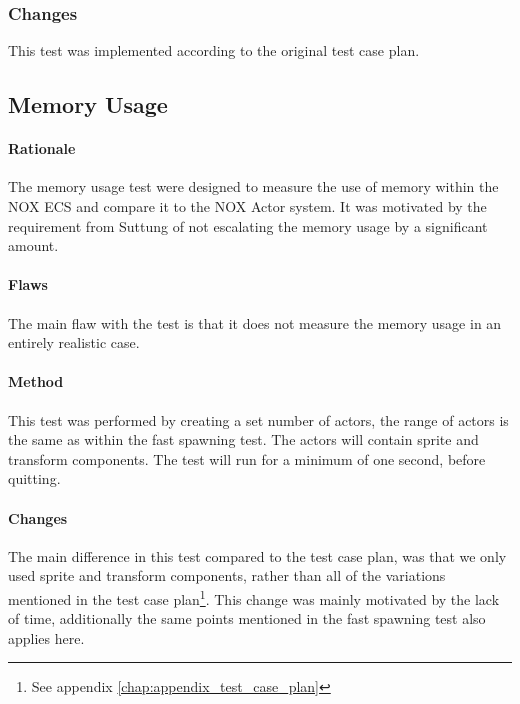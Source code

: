 \subsubsection{Changes}
This test was implemented according to the original test case plan.

\subsection{Memory Usage}
\paragraph{Rationale}
The memory usage test were designed to measure the use of memory within the NOX ECS and compare it to the NOX Actor system.
It was motivated by the requirement from Suttung of not escalating the memory usage by a significant amount.

\paragraph{Flaws}
The main flaw with the test is that it does not measure the memory usage in an entirely realistic case.

\paragraph{Method}
This test was performed by creating a set number of actors, the range of actors is the same as within the fast spawning test.
The actors will contain sprite and transform components.
The test will run for a minimum of one second, before quitting.

\paragraph{Changes}
The main difference in this test compared to the test case plan, was that we only used sprite and transform components,
rather than all of the variations mentioned in the test case plan\footnote{See appendix \ref{chap:appendix_test_case_plan}}.
This change was mainly motivated by the lack of time, additionally the same points mentioned in the fast spawning test also applies here.


